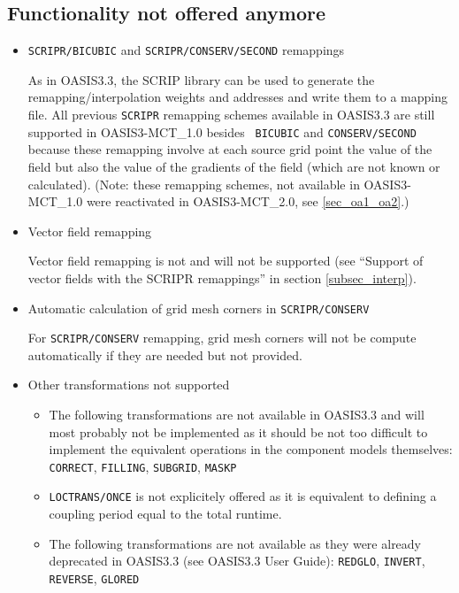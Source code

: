 \subsection{Functionality not offered anymore}
\label{sec_changes_old}

\begin{itemize}

\item {\tt SCRIPR/BICUBIC} and {\tt SCRIPR/CONSERV/SECOND} remappings

As in OASIS3.3, the SCRIP library can be used to generate the
  remapping/interpolation weights and addresses and write them to a
  mapping file. All previous {\tt SCRIPR} remapping
schemes available in OASIS3.3 are still supported in OASIS3-MCT\_1.0 besides {\tt
  BICUBIC} and {\tt CONSERV/SECOND} because these remapping involve
at each source grid point the value of the field but also the value of the
gradients of the field (which are not known or calculated). (Note: these remapping schemes, 
not available in OASIS3-MCT\_1.0 were reactivated in OASIS3-MCT\_2.0, see \ref{sec_oa1_oa2}.)

\item Vector field remapping

Vector field remapping is not and will not be supported (see ``Support
  of vector fields with the SCRIPR remappings'' in section \ref{subsec_interp}).

\item Automatic calculation of grid mesh corners in {\tt SCRIPR/CONSERV}

For {\tt SCRIPR/CONSERV} remapping, grid mesh corners will not
  be compute automatically if they are needed but not provided.  

\item Other transformations not supported

\begin{itemize}

\item The following transformations are not available in OASIS3.3
and will most probably not be implemented as it should be not
too difficult to implement the equivalent operations in the component
models themselves: {\tt CORRECT}, {\tt FILLING}, {\tt SUBGRID}, {\tt MASKP}

\item {\tt LOCTRANS/ONCE} is not explicitely offered as it is equivalent to
defining a coupling period equal to the total runtime.

\item The following transformations are not available as they were already
deprecated in OASIS3.3 (see OASIS3.3 User Guide): {\tt REDGLO}, {\tt INVERT},
{\tt REVERSE}, {\tt GLORED}


\end{itemize}
\end{itemize}
